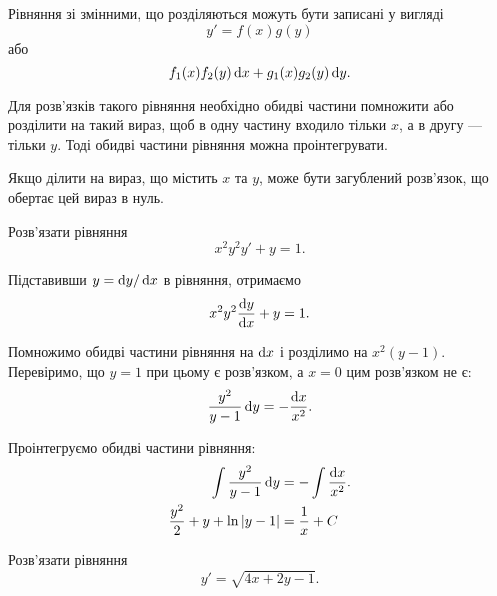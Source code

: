 Рівняння зі змінними, що розділяються можуть бути записані у вигляді \[y' = f(x) g(y)\] або \[f_1(x) f_2(y) \mathop{}\!\mathrm{d} x + g_1(x) g_2(y) \mathop{}\!\mathrm{d} y.\] 

Для розв'язків такого рівняння необхідно обидві частини помножити або розділити на такий вираз, щоб в одну частину входило тільки $x$, а в другу --- тільки $y$. Тоді обидві частини рівняння можна проінтегрувати. \parvskip

Якщо ділити на вираз, що містить $x$ та $y$, може бути загублений роз\-в'яз\-ок, що обертає цей вираз в нуль.

\begin{example}
	Розв'язати рівняння \[x^2 y^2 y' + y = 1.\]
\end{example}

\begin{solution}
	Підставивши $y = \mathop{}\!\mathrm{d} y / \mathop{}\!\mathrm{d} x$ в рівняння, отримаємо \[ x^2 y^2 \frac{\mathop{}\!\mathrm{d} y}{\mathop{}\!\mathrm{d} x} + y = 1.\] 

	Помножимо обидві частини рівняння на $\mathop{}\!\mathrm{d} x$ і розділимо на $x^2 (y - 1)$. Перевіримо, що $y = 1$ при цьому є роз\-в'яз\-ком, а $x = 0$ цим роз\-в'яз\-ком не є: \[ \frac{y^2}{y - 1} \mathop{}\!\mathrm{d} y = - \frac{\mathop{}\!\mathrm{d} x}{x^2}. \] 

	Проінтегруємо обидві частини рівняння:
	\begin{align*}
		\int \frac{y^2}{y - 1} \mathop{}\!\mathrm{d} y &= - \int \frac{\mathop{}\!\mathrm{d} x}{x^2}. \\
		\frac{y^2}{2} + y + \ln |y - 1| &= \frac{1}{x} + C
	\end{align*}
\end{solution}

\begin{example}
	Розв'язати рівняння \[ y' = \sqrt{4 x + 2 y - 1}.\] 
\end{example}

